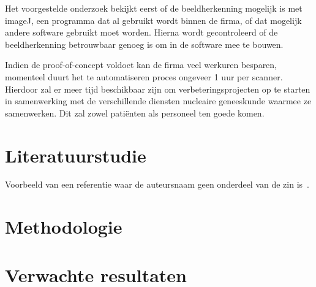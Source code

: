 \documentclass{hogent-article}
\begin{document}
Het voorgestelde onderzoek bekijkt eerst of de beeldherkenning mogelijk is met imageJ, een programma dat al gebruikt wordt binnen de firma, of dat mogelijk andere software gebruikt moet worden. Hierna wordt gecontroleerd of de beeldherkenning betrouwbaar genoeg is om in de software mee te bouwen.



Indien de proof-of-concept voldoet kan de firma veel werkuren besparen, momenteel duurt het te automatiseren proces ongeveer 1 uur per scanner. Hierdoor zal er meer tijd beschikbaar zijn om verbeteringsprojecten op te starten in samenwerking met de verschillende diensten nucleaire geneeskunde waarmee ze samenwerken. Dit zal zowel patiënten als personeel ten goede komen.


\section{Literatuurstudie}%
\label{sec:literatuurstudie}


Voorbeeld van een referentie waar de auteursnaam geen onderdeel van de zin is~\autocite{Moore2002}.

\autocite{Hykes2013}

\autocite{LewisFowler2014}

\autocite{Ansible2023}

\lipsum[4-9]

\section{Methodologie}%
\label{sec:methodologie}


\lipsum[10-12]

\section{Verwachte resultaten}%
\label{sec:verwachte-resultaten}
\end{document}
